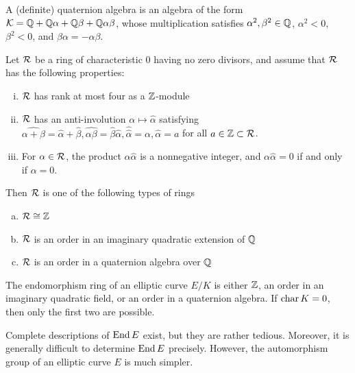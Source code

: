\begin{dfn}
A (definite) quaternion algebra is an algebra of the form $\mathcal{K}= \mathbb{Q} + \mathbb{Q} \alpha + \mathbb{Q} \beta + \mathbb{Q} \alpha \beta$, whose multiplication satisfies $\alpha^2, \beta^2 \in \mathbb{Q}$, $\alpha^2 < 0$, $\beta^2 < 0$, and $\beta\alpha= -\alpha\beta$.
\end{dfn}


\begin{thm}
Let $\mathcal{R}$ be a ring of characteristic 0 having no zero divisors, and assume that $\mathcal{R}$ has the following properties: \leavevmode\vspace{-1em}
	\begin{enumerate}[(i)] \itemsep-1em
	\item $\mathcal{R}$ has rank at most four as a $\mathbb{Z}$-module
	\item $\mathcal{R}$ has an anti-involution $\alpha \mapsto \hat{\alpha}$ satisfying $\hat{\alpha + \beta}= \hat{\alpha} + \hat{\beta}, \hat{\alpha\beta}= \hat{\beta} \hat{\alpha}, \hat{\hat{\alpha}}= \alpha, \hat{\alpha}= a$ for all $a \in \mathbb{Z} \subset \mathcal{R}$.
	\item For $\alpha \in \mathcal{R}$, the product $\alpha\hat{\alpha}$ is a nonnegative integer, and $\alpha\hat{\alpha}= 0$ if and only if $\alpha= 0$.
	\end{enumerate}
Then $\mathcal{R}$ is one of the following types of rings \leavevmode\vspace{-1em}
	\begin{enumerate}[(a)]  \itemsep-1em
	\item $\mathcal{R} \cong \mathbb{Z}$
	\item $\mathcal{R}$ is an order in an imaginary quadratic extension of $\mathbb{Q}$
	\item $\mathcal{R}$ is an order in a quaternion algebra over $\mathbb{Q}$
	\end{enumerate}
\end{thm}


\begin{cor}
The endomorphism ring of an elliptic curve $E/K$ is either $\mathbb{Z}$, an order in an imaginary quadratic field, or an order in a quaternion algebra. If $\operatorname{char} K= 0$, then only the first two are possible. 
\end{cor}


Complete descriptions of $\operatorname{End} E$ exist, but they are rather tedious. Moreover, it is generally difficult to determine $\operatorname{End} E$ precisely. However, the automorphism group of an elliptic curve $E$ is much simpler. 


